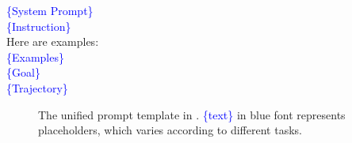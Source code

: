 
\begin{tcolorbox}[breakable,title=Unified Prompt Template]
\textcolor{blue}{\{System Prompt\}}\\ 
\textcolor{blue}{\{Instruction\}}\\
Here are examples:\\
\textcolor{blue}{\{Examples\}}\\
\textcolor{blue}{\{Goal\}}\\
\textcolor{blue}{\{Trajectory\}}
\end{tcolorbox}
\begin{figure}[h]
    \caption{The unified prompt template in \BenchName.
    \textcolor{blue}{\{text\}} in blue font represents placeholders, which varies according to different tasks.
    }
    \label{fig:prompt_template}
\end{figure}